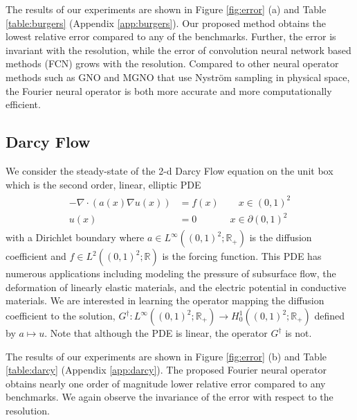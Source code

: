 \documentclass{article} %
\newcommand{\R}{\mathbb{R}}
\newcommand{\Ftrue}{G^\dagger}
\begin{document}
The results of our experiments are shown in Figure \ref{fig:error} (a) and Table \ref{table:burgers} (Appendix \ref{app:burgers}). Our proposed method obtains the lowest relative error compared to any of the benchmarks. Further, the error is invariant with the resolution, while the error of convolution neural network based methods (FCN) grows with the resolution. 
Compared to other neural operator methods such as GNO and MGNO that use Nystr\"om sampling in physical space, the Fourier neural operator is both more accurate and more computationally efficient.


\subsection{Darcy Flow}
\label{sec:darcy}
We consider the steady-state of the 2-d Darcy Flow equation on the unit box which is the second order, linear, elliptic PDE
\begin{align}\label{ssec:darcy}
\begin{split}
- \nabla \cdot (a(x) \nabla u(x)) &= f(x) \qquad x \in (0,1)^2 \\
u(x) &= 0 \qquad \quad \:\:x \in \partial (0,1)^2
\end{split}
\end{align}
with a Dirichlet boundary where $a \in L^\infty((0,1)^2;\R_+)$  is the diffusion coefficient and $f \in L^2((0,1)^2;\R)$ is the forcing function. This PDE has numerous applications including modeling the pressure of subsurface flow, the deformation of linearly elastic materials, and the electric potential in conductive materials. We are interested in learning the operator mapping the diffusion coefficient to the solution, 
$\Ftrue: L^\infty((0,1)^2;\R_+) \to H^1_0 ((0,1)^2;\R_+)$ defined by $a \mapsto u$. Note that although the PDE is linear, the operator $\Ftrue$ is not.


The results of our experiments are shown in Figure \ref{fig:error} (b) and Table \ref{table:darcy} (Appendix \ref{app:darcy}). The proposed Fourier neural operator obtains nearly one order of magnitude lower relative error compared to any benchmarks. We again observe the invariance of the error with respect to the resolution. 
\end{document}
